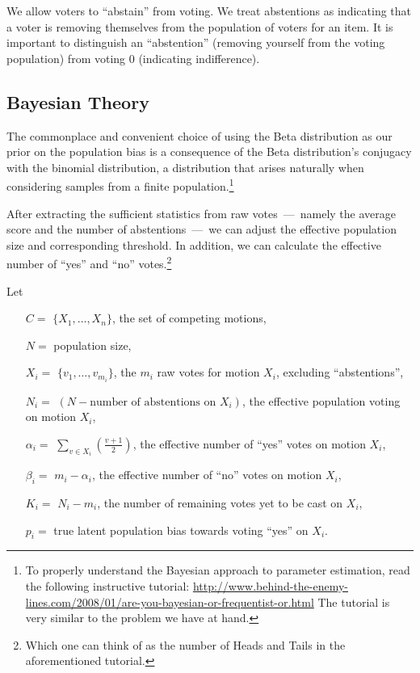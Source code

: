 \documentclass[chi_draft]{sigchi}
\begin{document}
We allow voters to ``abstain'' from voting.
We treat abstentions as indicating that a voter is removing themselves from the population of voters for an item.
It is important to distinguish an ``abstention'' (removing yourself from the voting population) from voting $0$
(indicating indifference).

\subsection{Bayesian Theory}

The commonplace and convenient choice of using the Beta distribution as our prior on the population bias is a
consequence of the Beta distribution's conjugacy with the binomial distribution, a distribution that arises
naturally when considering samples from a finite population.\footnote{To
properly understand the Bayesian approach to parameter estimation, read the following instructive tutorial:
\url{http://www.behind-the-enemy-lines.com/2008/01/are-you-bayesian-or-frequentist-or.html}
The tutorial is very similar to the problem we have at hand.}

After extracting the sufficient statistics from raw votes~---~namely the average score and the number of
abstentions~---~we can adjust the effective population size and corresponding threshold.
In addition, we can calculate the effective number of ``yes'' and ``no'' votes.\footnote{Which one can think
of as the number of Heads and Tails in the aforementioned tutorial.}

Let
\begin{description}
\begin{itemize}
\item[$C = $] $\{X_1,\ldots, X_n\}$, the set of competing motions,
\item[$N = $] population size,
\item[$X_i = $] $\{v_1, \ldots, v_{m_i}\}$, the $m_i$ raw votes for motion $X_i$, excluding ``abstentions'',
\item[$N_i = $] $(N - \textrm{number of abstentions on } X_i)$, the effective population voting on motion $X_i$,
\item[$\alpha_i = $] $\sum\limits_{v \in X_i} \left(\frac{v+1}{2}\right)$, the effective number of ``yes'' votes on motion $X_i$,
\item[$\beta_i = $] $m_i - \alpha_i$, the effective number of ``no'' votes on motion $X_i$,
\item[$K_i = $] $N_i - m_i$, the number of remaining votes yet to be cast on $X_i$,
\item[$p_i = $] true latent population bias towards voting ``yes'' on $X_i$.
\end{itemize}
\end{description}
\end{document}
